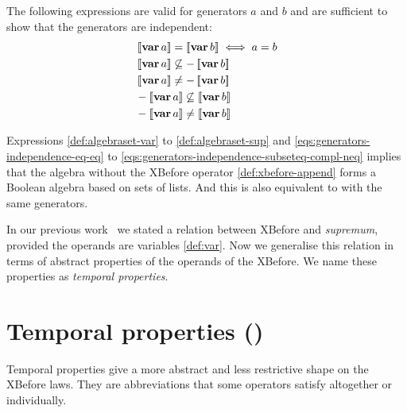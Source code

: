 The following expressions are valid for generators $a$ and $b$ and are sufficient to show that the generators are independent:
%
\begin{subequations}
\label{eqs:generators-independence}
\begin{align}
&\denote{\var{a}} = \denote{\var{b}} \iff a = b\label{eqs:generators-independence-eq-eq}\\
&\denote{\var{a}} \not\subseteq - \denote{\var{b}}\\
&\denote{\var{a}} \neq -\denote{\var{b}}\label{eqs:generators-independence-subseteq-neq-compl} \\
&- \denote{\var{a}} \not\subseteq \denote{\var{b}}\\
&- \denote{\var{a}} \neq \denote{\var{b}}\label{eqs:generators-independence-subseteq-compl-neq}
\end{align}
\end{subequations}

Expressions \cref{def:algebraset-var} to \cref{def:algebraset-sup} and \cref{eqs:generators-independence-eq-eq} to \cref{eqs:generators-independence-subseteq-compl-neq} implies that the \ac{algebra} without the \ac{XBefore} operator \cref{def:xbefore-append} forms a Boolean algebra based on sets of lists.
And this is also equivalent to  with the same generators.

In our previous work~\cite{DM2015} we stated a relation between \ac{XBefore} and \emph{supremum}, provided the operands are variables \cref{def:var}.
Now we generalise this relation in terms of abstract properties of the operands of the \ac{XBefore}.
We name these properties as \emph{temporal properties}.

\section{Temporal properties (\emph{\tempotext})}
\label{sec:temporal-properties}

Temporal properties give a more abstract and less restrictive shape on the \ac{XBefore} laws.
They are abbreviations that some operators satisfy altogether or individually.

